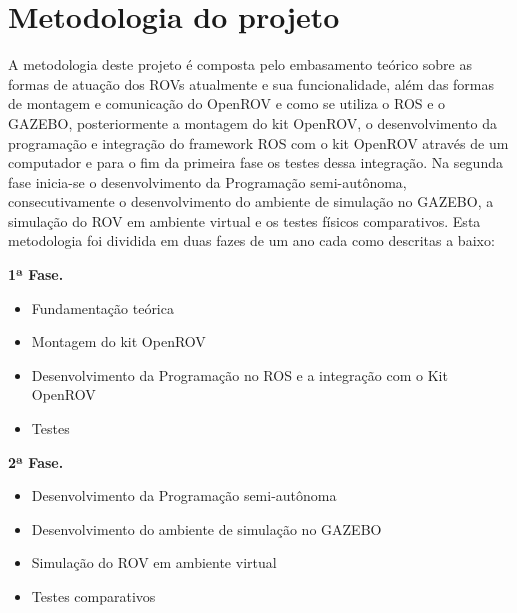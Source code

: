 \chapter{Metodologia do projeto}

A metodologia deste projeto é composta pelo embasamento teórico sobre as formas de atuação dos ROVs atualmente e sua funcionalidade, além das formas de montagem e comunicação do OpenROV e como se utiliza o ROS e o GAZEBO, posteriormente a montagem do kit OpenROV, o desenvolvimento da programação e integração do framework ROS com o kit OpenROV através de um computador e para o fim da primeira fase os testes dessa integração. Na segunda fase inicia-se o desenvolvimento da Programação semi-autônoma, consecutivamente o desenvolvimento do ambiente de simulação no GAZEBO, a simulação do ROV em ambiente virtual e os testes físicos comparativos. Esta metodologia foi dividida em duas fazes de um ano cada como descritas a baixo:

\textbf{\large 1ª Fase.}
\begin{itemize}
\item Fundamentação teórica
\item Montagem do kit OpenROV
\item Desenvolvimento da Programação no ROS e a integração com o Kit OpenROV 
\item Testes 

\end{itemize}


\textbf{\large 2ª Fase.}
\begin{itemize}
\item Desenvolvimento da Programação semi-autônoma 
\item Desenvolvimento do ambiente de simulação no GAZEBO
\item Simulação do ROV em ambiente virtual
\item Testes comparativos
\end{itemize}





